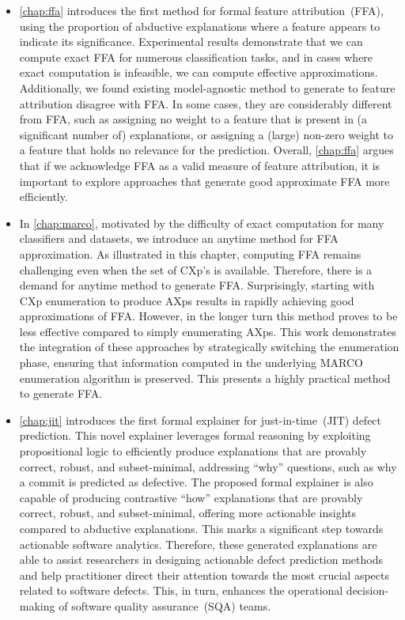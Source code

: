 \begin{itemize}
	\item \autoref{chap:ffa}  introduces the first method for formal feature attribution~(FFA),
		using the proportion of abductive explanations where a feature appears to
		indicate its significance.
		Experimental results demonstrate that we can compute exact FFA for numerous classification tasks, 
		and in cases where exact computation is infeasible, we can compute effective approximations.
		Additionally, we found existing model-agnostic method to generate to feature attribution 
		disagree with FFA.
		In some cases, they are considerably different from FFA, such as assigning no weight to 
		a feature that is present in (a significant number of) explanations,
		or assigning a (large) non-zero weight to a feature that holds no relevance for the prediction.
		Overall, \autoref{chap:ffa} argues that if we acknowledge FFA as a valid measure 
		of feature attribution, it is important to explore approaches that generate good 
		approximate FFA more efficiently.

	\item In \autoref{chap:marco}, motivated by the difficulty of exact computation for 
		many classifiers and datasets, we introduce an anytime method for FFA
		approximation.
		As illustrated in this chapter, computing FFA remains challenging even 
		when the set of CXp's is available. 
		Therefore, there is a demand for anytime method to generate FFA.
		Surprisingly, starting with CXp enumeration to produce AXps results in 
		rapidly achieving good approximations of FFA.
		However, in the longer turn this method proves to be less effective 
		compared to simply enumerating AXps.
		This work demonstrates the integration of these approaches by strategically 
		switching the enumeration phase, ensuring that information computed in the 
		underlying MARCO enumeration algorithm is preserved.
		This presents a highly practical method to generate FFA.

	\item \autoref{chap:jit} introduces the first formal explainer for just-in-time~(JIT) 
		defect prediction. 
		This novel explainer leverages formal reasoning by exploiting propositional logic
		to efficiently produce explanations that are provably correct, robust, 
		and subset-minimal, addressing ``why'' questions, such as why a commit is 
		predicted as defective.
		The proposed formal explainer is also capable of producing contrastive ``how'' 
		explanations that are provably correct, robust, and subset-minimal, 
		offering more actionable insights compared to abductive explanations.
		This marks a significant step towards actionable software analytics.
		Therefore, these generated explanations are able to assist researchers 
		in designing actionable defect prediction methods and help practitioner direct their
		attention towards the most crucial aspects related to software defects. 
		This, in turn, enhances the operational decision-making of software quality assurance~(SQA) teams.
\end{itemize}

